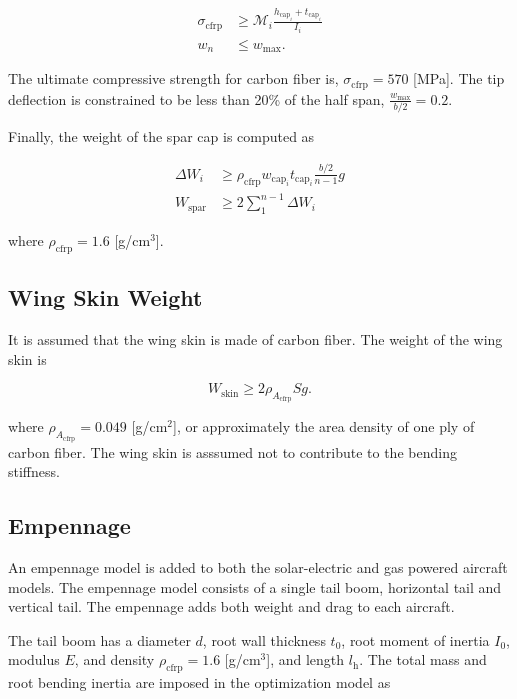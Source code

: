 \begin{align}
    \label{e:stresscont}
    \sigma_{\text{cfrp}} &\geq \mathcal{M}_i \frac{h_{\text{cap}_i}+t_{\text{cap}_i}}{I_i}\\
    \label{e:defcont}
    w_n &\leq w_{\text{max}}.
\end{align}

The ultimate compressive strength for carbon fiber is, $\sigma_{\text{cfrp}} = 570$ [MPa].\cite{carbonfiber}
The tip deflection is constrained to be less than 20\% of the half span, $\frac{w_{\text{max}}}{b/2} = 0.2$.

Finally, the weight of the spar cap is computed as

\begin{align}
    \label{e:sparmass}
    \Delta W_i &\geq \rho_{\text{cfrp}} w_{\text{cap}_i}t_{\text{cap}_i} \frac{b/2}{n-1}g \\
    \label{e:sparmasssum}
    W_{\text{spar}} &\geq 2 \sum\limits_{1}^{n-1} \Delta W_i
\end{align}

where $\rho_{\text{cfrp}} = 1.6$ [g/cm$^3$].\cite{carbonfiber}

\subsection{Wing Skin Weight}

It is assumed that the wing skin is made of carbon fiber.  The weight of the wing skin is 

\begin{equation}
    \label{e:wingskinweight}
    W_{\text{skin}} \geq 2 \rho_{A_{\text{cfrp}}} S g.
\end{equation}

where $\rho_{A_{\text{cfrp}}} = 0.049$ [g/cm$^2$], or approximately the area density of one ply of carbon fiber.\cite{carbonfiber} The wing skin is asssumed not to contribute to the bending stiffness. 

\subsection{Empennage}

An empennage model is added to both the solar-electric and gas powered aircraft models.  The empennage model consists of a single tail boom, horizontal tail and vertical tail.  
The empennage adds both weight and drag to each aircraft.  

The tail boom has a diameter $d$, root wall thickness $t_0$, root moment of inertia $I_0$, modulus $E$, and density $\rho_{\text{cfrp}} = 1.6$ [g/cm$^3$], and length $l_{\text{h}}$. 
The total mass and root bending inertia are imposed in the optimization model as 

